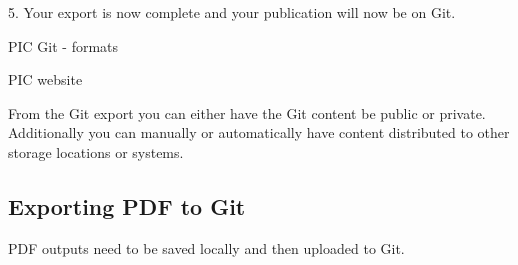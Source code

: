 \documentclass{article}
\begin{document}
5. Your export is now complete and your publication will now be on Git.


PIC Git - formats


PIC website 


From the Git export you can either have the Git content be public or private. Additionally you can manually or automatically have content distributed to other storage locations or systems.


\subsection{Exporting PDF to Git}\label{H9093471}



PDF outputs need to be saved locally and then uploaded to Git.
\end{document}

